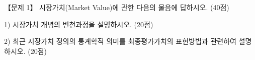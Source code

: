 \begin{longquestion}{【문제 1】}
시장가치(Market Value)에 관한 다음의 물음에 답하시오. (40점) \par
1) 시장가치 개념의 변천과정을 설명하시오. (20점) \par
2) 최근 시장가치 정의의 통계학적 의미를 최종평가가치의 표현방법과 관련하여 설명하시오. (20점) \par
\end{longquestion}

